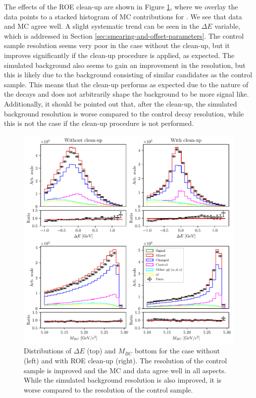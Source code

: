 The effects of the ROE clean-up are shown in Figure \ref{fig:roe_val}, where we overlay the data points to a stacked histogram of MC contributions for \vars. We see that data and MC agree well. A slight systematic trend can be seen in the $\Delta E$ variable, which is addressed in Section \ref{sec:smearing-and-offset-parameters}. The control sample resolution seems very poor in the case without the clean-up, but it improves significantly if the clean-up procedure is applied, as expected. The simulated background also seems to gain an improvement in the resolution, but this is likely due to the background consisting of similar candidates as the control sample. This means that the clean-up performs as expected due to the nature of the decays and does not arbitrarily shape the background to be more signal like. Additionally, it should be pointed out that, after the clean-up, the simulated background resolution is worse compared to the control decay resolution, while this is not the case if the clean-up procedure is not performed.
\begin{figure}[H]
	\centering
	\captionsetup{width=0.8\linewidth}
	\includegraphics[width=\linewidth]{fig/roe_val}
	\caption{Distributions of $\Delta E$ (top) and $M_{BC}$ bottom for the case without (left) and with ROE clean-up (right). The resolution of the control sample is improved and the MC and data agree well in all aspects. While the simulated background resolution is also improved, it is worse compared to the resolution of the control sample.}
	\label{fig:roe_val}
\end{figure}


